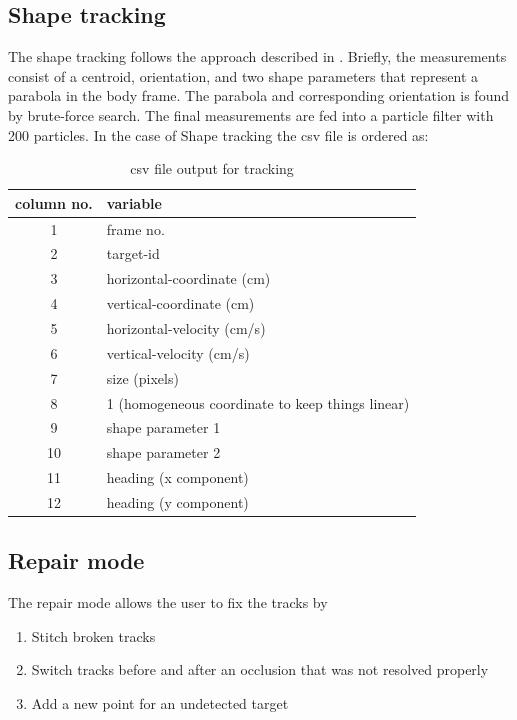 \documentclass[12pt]{article}
\begin{document}
\subsection{Shape tracking}
The shape tracking follows the approach described in \cite{Bartolini2014}. Briefly, the measurements consist of a centroid, orientation, and two shape parameters that represent a parabola in the body frame. The parabola and corresponding orientation is found by brute-force search. The final measurements are fed into a particle filter with 200 particles. 
In the case of Shape tracking the csv file is ordered as:
\begin{table}[t]
\caption{csv file output for  tracking}
\begin{center}
\begin{tabular}[t]{cl}
\hline
column no. &  variable \\
\hline
1 & frame  no. \\
2 & target-id \\
3 &  horizontal-coordinate (cm) \\
4 & vertical-coordinate (cm) \\
5 &  horizontal-velocity (cm/s) \\
6 &  vertical-velocity (cm/s) \\
7 &  size (pixels) \\
8& 1 (homogeneous coordinate to keep things linear) \\
9  &shape parameter 1\\
10 &  shape parameter 2\\
11 &  heading (x component) \\
12 &  heading (y component) \\
\end{tabular}
\end{center}
\label{tab:params}
\end{table}


\subsection{Repair mode}
The repair mode allows the user to fix the tracks by
\begin{enumerate}
\item Stitch broken tracks
\item Switch tracks before and after an occlusion that was not resolved properly
\item Add a new point for an undetected target
\end{enumerate}
\end{document}
